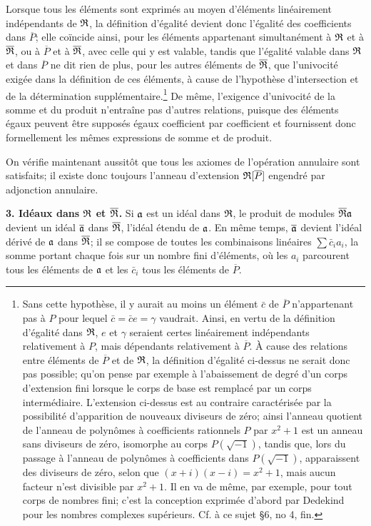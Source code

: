 Lorsque tous les éléments sont exprimés au moyen d'éléments linéairement indépendants de $\mathfrak R$, la définition d'égalité devient donc l'égalité des coefficients dans $\overline P$; elle coïncide ainsi, pour les éléments appartenant simultanément à $\mathfrak R$ et à $\overline{\mathfrak R}$, ou à $\overline P$ et à $\overline{\mathfrak R}$, avec celle qui y est valable, tandis que l'égalité valable dans $\mathfrak R$ et dans $\overline P$ ne dit rien de plus, pour les autres éléments de $\overline{\mathfrak R}$, que l'univocité exigée dans la définition de ces éléments, à cause de l'hypothèse d'intersection et de la détermination supplémentaire.\footnote{Sans cette hypothèse, il y aurait au moins un élément $\bar c$ de $\overline P$ n'appartenant pas à $P$ pour lequel $\bar c=\bar c e=\gamma$ vaudrait. Ainsi, en vertu de la définition d'égalité dans $\mathfrak R$, $e$ et $\gamma$ seraient certes linéairement indépendants relativement à $P$, mais dépendants relativement à $\overline P$. À cause des relations entre éléments de $\overline P$ et de $\mathfrak R$, la définition d'égalité ci-dessus ne serait donc pas possible; qu'on pense par exemple à l'abaissement de degré d'un corps d'extension fini lorsque le corps de base est remplacé par un corps intermédiaire. L'extension ci-dessus est au contraire caractérisée par la possibilité d'apparition de nouveaux diviseurs de zéro; ainsi l'anneau quotient de l'anneau de polynômes à coefficients rationnels $P$ par $x^2+1$ est un anneau sans diviseurs de zéro, isomorphe au corps $P(\sqrt{-1})$, tandis que, lors du passage à l'anneau de polynômes à coefficients dans $P(\sqrt{-1})$, apparaissent des diviseurs de zéro, selon que $(x+i)(x-i)=x^2+1$, mais aucun facteur n'est divisible par $x^2+1$. Il en va de même, par exemple, pour tout corps de nombres fini; c'est la conception exprimée d'abord par Dedekind pour les nombres complexes supérieurs. Cf. à ce sujet \S 6, no 4, fin.} De même, l'exigence d'univocité de la somme et du produit n'entraîne pas d'autres relations, puisque des éléments égaux peuvent être supposés égaux coefficient par coefficient et fournissent donc formellement les mêmes expressions de somme et de produit.

On vérifie maintenant aussitôt que tous les axiomes de l'opération annulaire sont satisfaits; il existe donc toujours l'anneau d'extension $\mathfrak R[\overline P]$ engendré par adjonction annulaire.

\textbf{3. Idéaux dans $\mathfrak R$ et $\overline{\mathfrak R}$.} Si $\mathfrak a$ est un idéal dans $\mathfrak R$, le produit de modules $\overline{\mathfrak R}\mathfrak a$ devient un idéal $\overline{\mathfrak a}$ dans $\overline{\mathfrak R}$, l'idéal étendu de $\mathfrak a$. En même temps, $\overline{\mathfrak a}$ devient l'idéal dérivé de $\mathfrak a$ dans $\overline{\mathfrak R}$; il se compose de toutes les combinaisons linéaires $\sum \bar c_i a_i$, la somme portant chaque fois sur un nombre fini d'éléments, où les $a_i$ parcourent tous les éléments de $\mathfrak a$ et les $\bar c_i$ tous les éléments de $\overline P$.

